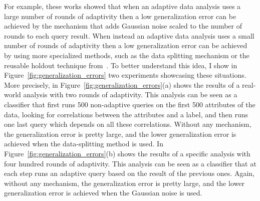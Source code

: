  For example, these works showed that when an adaptive data analysis uses a large number of rounds 
 of adaptivity then a low generalization error can be achieved by the mechanism that 
 adds Gaussian noise scaled to the number of rounds to each query result.
 When instead an adaptive data analysis uses a small number of rounds of adaptivity then a low generalization error can be achieved by using more specialized methods, such as the data splitting mechanism or the reusable holdout technique from~\cite{DworkFHPRR15}.
 To better understand this idea, I show in Figure~\ref{fig:generalization_errors} two experiments showcasing these situations. 
 More precisely, in Figure~\ref{fig:generalization_errors}(a) shows the results of a real-world analysis
 with two rounds of adaptivity. 
 This analysis can be seen as a classifier that first runs 500 non-adaptive queries on the first 500 attributes of the data, looking for correlations between the attributes and a label, and then runs one last query which depends on all these correlations. 
 Without any mechanism, the generalization error is pretty large, and the lower generalization error is achieved when the data-splitting method is used. 
 In Figure~\ref{fig:generalization_errors}(b) shows the results of a specific analysis
 with four hundred rounds of adaptivity. 
 This analysis can be seen as a classifier that at each step runs an adaptive query based on the result of the previous ones. 
 Again, without any mechanism, the generalization error is pretty large, and the lower generalization error is achieved when the Gaussian noise is used. 
